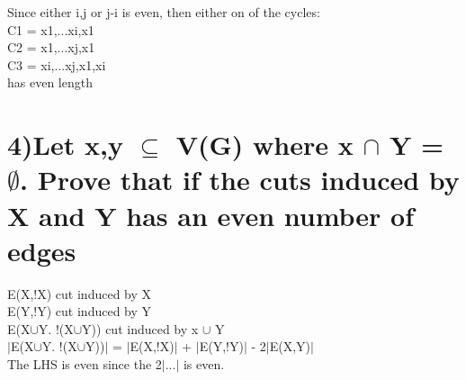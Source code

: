 \documentclass[12pt]{article}
\begin{document}
	Since either i,j or j-i is even, then either on of the cycles:\\
	C1 = x1,...xi,x1\\
	C2 = x1,...xj,x1\\
	C3 = xi,...xj,x1,xi\\
	has even length\\
	
	\section*{4)Let x,y $\subseteq$ V(G) where x $\cap$ Y = $\emptyset$. Prove that if the cuts induced by X and Y has an even number of edges}
	
	E(X,!X) cut induced by X\\
	E(Y,!Y) cut induced by Y\\
	E(X$\cup$Y. !(X$\cup$Y)) cut induced by x $\cup$ Y\\
	$|$E(X$\cup$Y. !(X$\cup$Y))$|$ = $|$E(X,!X)$|$ + $|$E(Y,!Y)$|$ - 2$|$E(X,Y)$|$\\
	The LHS is even since the 2$|...|$ is even.\\
	
\end{document}
